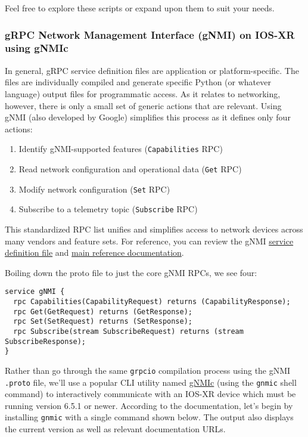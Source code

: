 Feel free to explore these scripts or expand upon them to suit your needs.

\subsubsection{gRPC Network Management Interface (gNMI) on IOS-XR using gNMIc}
In general, gRPC service definition files are application or platform-specific.
The files are individually compiled and generate specific Python (or whatever
language) output files for programmatic access. As it relates to networking,
however, there is only a small set of generic actions that are relevant.
Using gNMI (also developed by Google) simplifies this process as it
defines only four actions:

\begin{enumerate}
  \item Identify gNMI-supported features (\verb|Capabilities| RPC)
  \item Read network configuration and operational data (\verb|Get| RPC)
  \item Modify network configuration (\verb|Set| RPC)
  \item Subscribe to a telemetry topic (\verb|Subscribe| RPC)
\end{enumerate}

This standardized RPC list unifies and simplifies access to network devices
across many vendors and feature sets. For reference, you can review the gNMI
\href{https://github.com/openconfig/gnmi/blob/master/proto/gnmi/gnmi.proto}{service definition file} and
\href{https://github.com/openconfig/reference/blob/master/rpc/gnmi/gnmi-specification.md}{main reference documentation}.

Boiling down the proto file to just the core gNMI RPCs, we see four:

\begin{verbatim}
service gNMI {
  rpc Capabilities(CapabilityRequest) returns (CapabilityResponse);
  rpc Get(GetRequest) returns (GetResponse);
  rpc Set(SetRequest) returns (SetResponse);
  rpc Subscribe(stream SubscribeRequest) returns (stream SubscribeResponse);
}
\end{verbatim}

Rather than go through the same \verb|grpcio| compilation process using
the gNMI \verb|.proto| file, we'll use a popular CLI utility named
\href{https://gnmic.kmrd.dev}{gNMIc} (using the \verb|gnmic| shell command)
to interactively communicate with an IOS-XR device which must be running
version 6.5.1 or newer. According to the documentation, let's begin
by installing \verb|gnmic| with a single command shown below. The output
also displays the current version as well as relevant documentation URLs.

